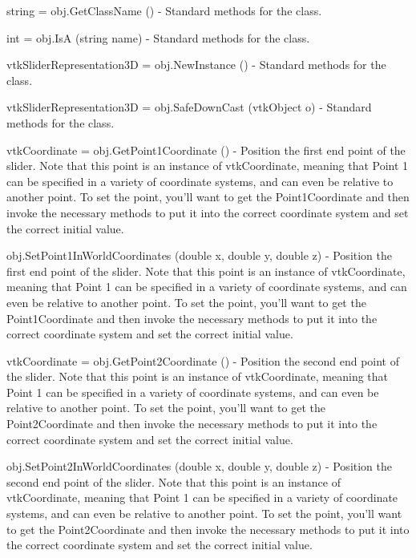 \begin{DoxyItemize}
\item {\ttfamily string = obj.\-Get\-Class\-Name ()} -\/ Standard methods for the class.  
\item {\ttfamily int = obj.\-Is\-A (string name)} -\/ Standard methods for the class.  
\item {\ttfamily vtk\-Slider\-Representation3\-D = obj.\-New\-Instance ()} -\/ Standard methods for the class.  
\item {\ttfamily vtk\-Slider\-Representation3\-D = obj.\-Safe\-Down\-Cast (vtk\-Object o)} -\/ Standard methods for the class.  
\item {\ttfamily vtk\-Coordinate = obj.\-Get\-Point1\-Coordinate ()} -\/ Position the first end point of the slider. Note that this point is an instance of vtk\-Coordinate, meaning that Point 1 can be specified in a variety of coordinate systems, and can even be relative to another point. To set the point, you'll want to get the Point1\-Coordinate and then invoke the necessary methods to put it into the correct coordinate system and set the correct initial value.  
\item {\ttfamily obj.\-Set\-Point1\-In\-World\-Coordinates (double x, double y, double z)} -\/ Position the first end point of the slider. Note that this point is an instance of vtk\-Coordinate, meaning that Point 1 can be specified in a variety of coordinate systems, and can even be relative to another point. To set the point, you'll want to get the Point1\-Coordinate and then invoke the necessary methods to put it into the correct coordinate system and set the correct initial value.  
\item {\ttfamily vtk\-Coordinate = obj.\-Get\-Point2\-Coordinate ()} -\/ Position the second end point of the slider. Note that this point is an instance of vtk\-Coordinate, meaning that Point 1 can be specified in a variety of coordinate systems, and can even be relative to another point. To set the point, you'll want to get the Point2\-Coordinate and then invoke the necessary methods to put it into the correct coordinate system and set the correct initial value.  
\item {\ttfamily obj.\-Set\-Point2\-In\-World\-Coordinates (double x, double y, double z)} -\/ Position the second end point of the slider. Note that this point is an instance of vtk\-Coordinate, meaning that Point 1 can be specified in a variety of coordinate systems, and can even be relative to another point. To set the point, you'll want to get the Point2\-Coordinate and then invoke the necessary methods to put it into the correct coordinate system and set the correct initial value.  

\end{DoxyItemize}

